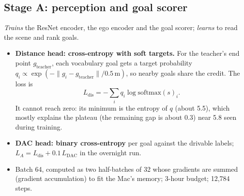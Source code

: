 \documentclass[11pt,a4paper]{article}
\begin{document}
\subsection{Stage A: perception and goal scorer}
\textit{Trains} the ResNet encoder, the ego encoder and the goal scorer; \textit{learns} to read the scene
and rank goals.
\begin{itemize}
  \item \textbf{Distance head: cross-entropy with soft targets.} For the teacher's end point
        $g_{\text{teacher}}$, each vocabulary goal gets a target probability
        $q_i \propto \exp(-\lVert g_i - g_{\text{teacher}}\rVert / 0.5\,\mathrm{m})$, so nearby goals share
        the credit. The loss is
        \[ L_{\text{dis}} = -\sum_i q_i \log \mathrm{softmax}(s)_i . \]
        It cannot reach zero: its minimum is the entropy of $q$ (about 5.5), which mostly explains the plateau (the remaining gap is about 0.3)
        near 5.8 seen during training.
  \item \textbf{DAC head: binary cross-entropy} per goal against the drivable labels;
        $L_A = L_{\text{dis}} + 0.1\,L_{\text{DAC}}$ in the overnight run.
  \item Batch 64, computed as two half-batches of 32 whose gradients are summed (gradient accumulation) to
        fit the Mac's memory; 3-hour budget; 12{,}784 steps.
\end{itemize}
\end{document}
